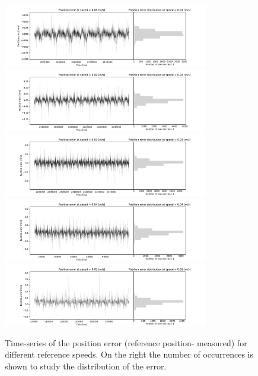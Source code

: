 \documentclass[12pt,a4paper, twoside]{article}
\begin{document}
\begin{figure}[htp]
	\centering
	\includegraphics[width=0.8\textwidth]{fig/pos_error_0}\\
	\includegraphics[width=0.8\textwidth]{fig/pos_error_1}\\
	\includegraphics[width=0.8\textwidth]{fig/pos_error_2}\\
	\includegraphics[width=0.8\textwidth]{fig/pos_error_3}\\
	\includegraphics[width=0.8\textwidth]{fig/pos_error_4}
	\caption[Position error time-series]{Time-series of the position error (reference position- measured) for different reference speeds. On the right the number of occurrences is shown to study the distribution of the error.}\label{fig:pos_error}
\end{figure}
\end{document}
